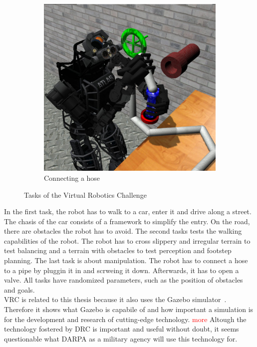 \begin{figure}
\begin{subfigure}[b]{0.3\textwidth}
    \includegraphics[width=\textwidth]{pics/darpa_hose}
    \caption{Connecting a hose}
    \label{fig:vrc_hose}
  \end{subfigure}
  \caption{Tasks of the Virtual Robotics Challenge~\cite{vrc_pics}}
  \label{fig:vrc}
\end{figure}
In the first task, the robot has to walk to a car, enter it and drive along a street. The chasis of the car consists of a framework to simplify the entry. On the road, there are obstacles the robot has to avoid. The second tasks tests the walking capabilities of the robot. The robot has to cross slippery and irregular terrain to test balancing and a terrain with obstacles to test perception and footstep planning. The last task is about manipulation. The robot has to connect a hose to a pipe by pluggin it in and scrweing it down. Afterwards, it has to open a valve. All tasks have randomized parameters, such as the position of obstacles and goals.\\
VRC is related to this thesis because it also uses the Gazebo simulator~\cite{IEEESpectrum}. Therefore it shows what Gazebo is capabile of and how important a simulation is for the development and research of cutting-edge technology. \textcolor{red}{more}
Altough the technology fostered by DRC is important and useful without doubt, it seems questionable what DARPA as a military agency will use this technology for.


